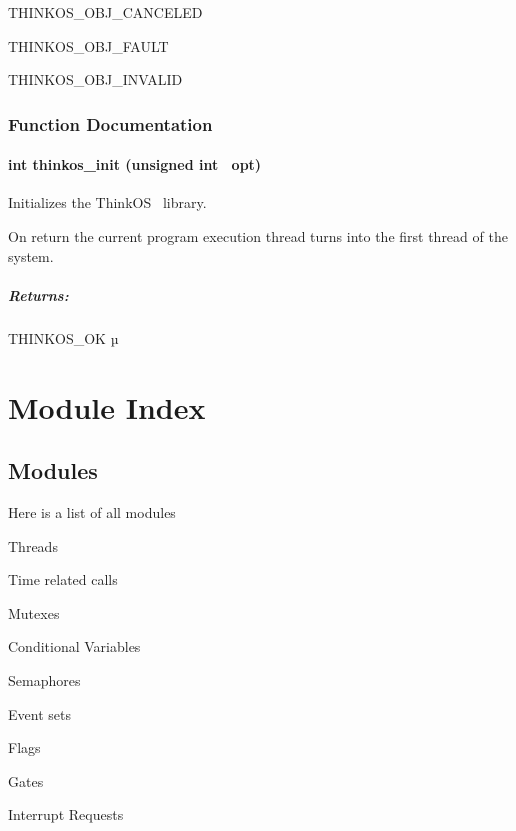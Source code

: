 {{THINKOS\_OBJ\_CANCELED}{~ }

{THINKOS\_OBJ\_FAULT}{~ }

{THINKOS\_OBJ\_INVALID}{~ }

{}

\subsubsection{\texorpdfstring{{Function
Documentation}}{Function Documentation}}\label{function-documentation-10}

\paragraph{\texorpdfstring{{int thinkos\_init (unsigned int
~opt)}}{int thinkos\_init (unsigned int ~opt)}}\label{int-thinkos_init-unsigned-int-opt}

{}

{Initializes the }{ThinkOS}{~ library. }

{On return the current program execution thread turns into the first
thread of the system. }

\subparagraph{\texorpdfstring{{Returns:}}{Returns:}}\label{returns-55}

{THINKOS\_OK µ}

{}



\section{\texorpdfstring{{Module
Index}}{Module Index}}\label{module-index}

\subsection{\texorpdfstring{{Modules}}{Modules}}\label{modules}

{Here is a list of all modules}

{Threads~~~~~~~~}

{Time related calls~~~~~~~~}

{Mutexes~~~~~~~~}

{Conditional Variables~~~~~~~~}

{Semaphores~~~~~~~~}

{Event sets~~~~~~~~}

{Flags~~~~~~~~}

{Gates~~~~~~~~}

{Interrupt Requests~~~~~~~~}

}
